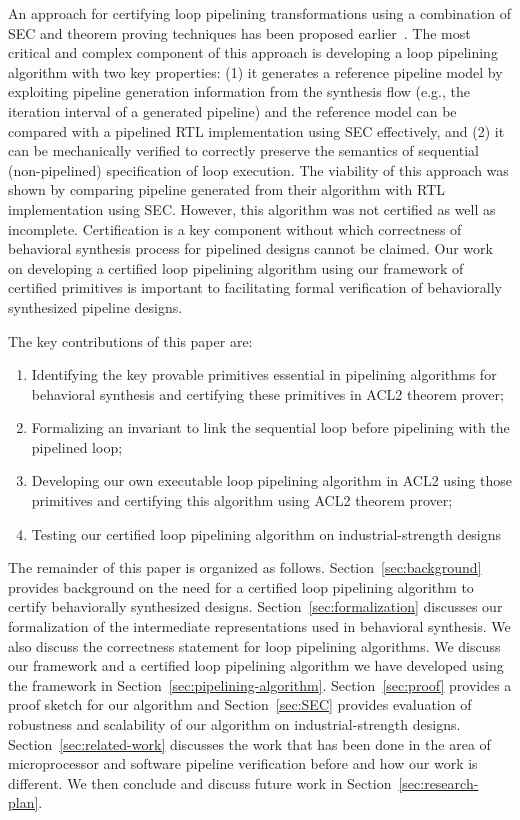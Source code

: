 An approach for certifying loop pipelining transformations using a combination of SEC and 
theorem proving techniques has been proposed earlier~\cite{hrx:dac-12}. The most critical and complex
component of this approach is developing
a loop pipelining algorithm with two key properties: (1) it generates a reference pipeline model 
by exploiting pipeline generation information from the synthesis flow (e.g., the iteration interval 
of a generated pipeline) and the reference model can be compared with a pipelined RTL 
implementation using SEC effectively, and (2) it can be mechanically verified to correctly preserve the semantics of
sequential (non-pipelined) specification of loop execution. The viability of 
this approach was shown by comparing pipeline generated from their algorithm with RTL implementation 
using SEC. However, this algorithm was not certified as well as incomplete. Certification is a key component 
without which correctness of behavioral synthesis process for pipelined designs cannot be claimed.
Our work on developing a certified loop pipelining algorithm using our framework of certified 
primitives is important to facilitating formal verification of behaviorally synthesized
 pipeline designs.

\medskip
The key contributions of this paper are:
\begin{enumerate}
\item Identifying the key provable primitives essential in pipelining algorithms for behavioral synthesis and certifying these primitives in ACL2 theorem prover;
\item Formalizing an invariant to link the sequential loop before pipelining with the pipelined loop;
\item Developing our own executable loop pipelining algorithm in ACL2 using those primitives and certifying this algorithm using ACL2 theorem prover;
\item Testing our certified loop pipelining algorithm on industrial-strength designs
\end{enumerate}

The remainder of this paper is organized as
follows. Section~\ref{sec:background} provides background on the need for a certified loop pipelining algorithm 
to certify behaviorally synthesized designs. Section~\ref{sec:formalization} 
discusses our formalization of the intermediate representations used in behavioral synthesis.
We also discuss the correctness statement for loop pipelining algorithms. 
We discuss our framework and a certified loop pipelining algorithm we have developed using the framework in Section~\ref{sec:pipelining-algorithm}. Section~\ref{sec:proof} provides a proof sketch for our algorithm and Section~\ref{sec:SEC} provides evaluation of robustness and 
scalability of our algorithm on industrial-strength designs. Section~\ref{sec:related-work} discusses the work that has been done in the area of microprocessor and software pipeline verification before and how our work is different. We then conclude and discuss future work in Section~\ref{sec:research-plan}.


